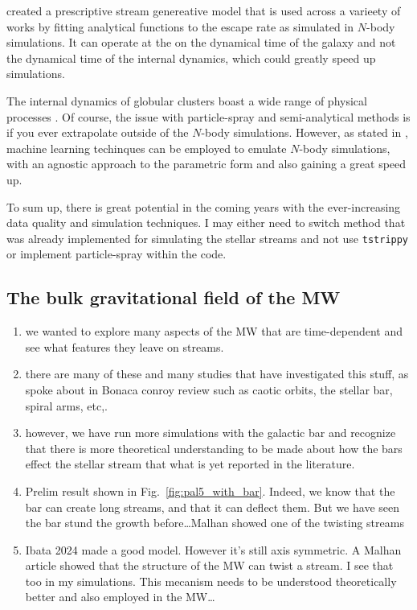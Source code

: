         \citet{2015MNRAS.452..301F} created a prescriptive stream genereative model that is used across a varieety of works by fitting analytical functions to the escape rate as simulated in $N$-body simulations. It can operate at the on the dynamical time of the galaxy and not the dynamical time of the internal dynamics, which could greatly speed up simulations. 
        
        The internal dynamics of globular clusters boast a wide range of physical processes \citep{1997A&ARv...8....1M}. Of course, the issue with particle-spray and semi-analytical methods is if you ever extrapolate outside of the $N$-body simulations. However, as stated in \citet{2023ApJ...959...99T}, machine learning techinques can be employed to emulate $N$-body simulations, with an agnostic approach to the parametric form and also gaining a great speed up. 

        To sum up, there is great potential in the coming years with the ever-increasing data quality and simulation techniques. I may either need to switch method that was already implemented for simulating the stellar streams and not use \texttt{tstrippy} or implement particle-spray within the code. 

    \subsection{The bulk gravitational field of the MW}

            \begin{enumerate}
                \item we wanted to explore many aspects of the MW that are time-dependent and see what features they leave on streams. 
                \item there are many of these and many studies that have investigated this stuff, as spoke about in Bonaca conroy review such as caotic orbits, the stellar bar, spiral arms, etc,. 
                \item however, we have run more simulations with the galactic bar and recognize that there is more theoretical understanding to be made about how the bars effect the stellar stream that what is yet reported in the literature. 
                \item Prelim result shown in Fig.~\ref{fig:pal5_with_bar}. Indeed, we know that the bar can create long streams, and that it can deflect them. But we have seen the bar stund the growth before\dots Malhan showed one of the twisting streams 
                \item Ibata 2024 made a good model. However it's still axis symmetric. A Malhan article showed that the structure of the MW can twist a stream. I see that too in my simulations. This mecanism needs to be understood theoretically better and also employed in the MW\dots
            \end{enumerate}


